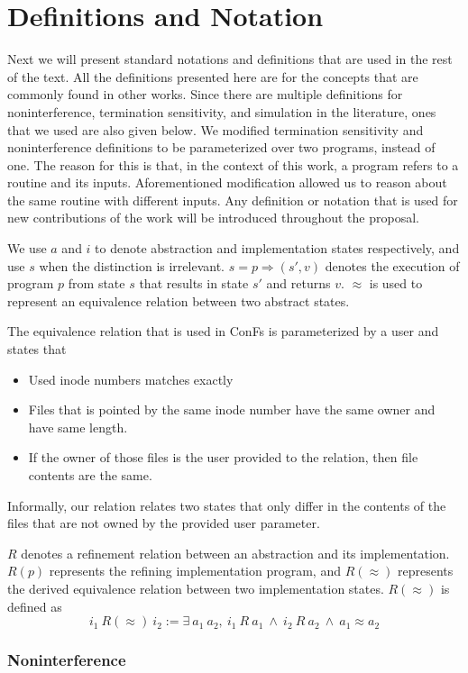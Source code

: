 \section{Definitions and Notation}
Next we will present standard notations and definitions that are used in the rest of the text. All the definitions presented here are for the concepts that are commonly found in other works. Since there are multiple definitions for noninterference, termination sensitivity, and simulation in the literature, ones that we used are also given below. We modified termination sensitivity and noninterference definitions to be parameterized over two programs, instead of one. The reason for this is that, in the context of this work, a program refers to a routine and its inputs. Aforementioned modification allowed us to reason about the same routine with different inputs. Any definition or notation that is used for new contributions of the work will be introduced throughout the proposal.

We use $a$ and $i$ to denote abstraction and implementation states respectively, and use $s$ when the distinction is irrelevant.
$s =p\Rightarrow (s', v)$ denotes the execution of program $p$ from state $s$ that results in state $s'$ and returns $v$. $\approx$ is used to represent an equivalence relation between two abstract states. 

The equivalence relation that is used in ConFs is parameterized by a user and states that 
\begin{itemize}
	\item Used inode numbers matches exactly
	\item Files that is pointed by the same inode number have the same owner and have same length.
	\item If the owner of those files is the user provided to the relation, then file contents are the same.
\end{itemize}

Informally, our relation relates two states that only differ in the contents of the files that are not owned by the provided user parameter.

$R$ denotes a refinement relation between an abstraction and its implementation. $R(p)$ represents the refining implementation program, and $R(\approx)$ represents the derived equivalence relation between two implementation states. $R(\approx)$ is defined as 
$$
i_1\ R(\approx)\ i_2 := \exists\ a_1\ a_2,\ i_1\ R\ a_1\ \wedge\ i_2\ R\ a_2\ \wedge\ a_1 \approx a_2
$$


\subsubsection*{Noninterference}

